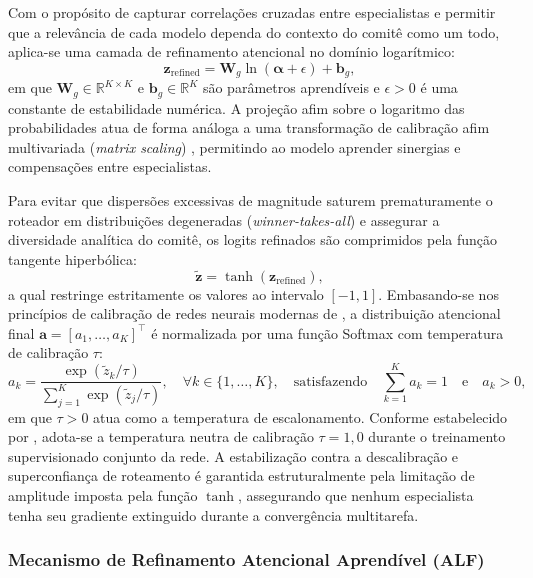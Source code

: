 Com o propósito de capturar correlações cruzadas entre especialistas e permitir que a relevância de cada modelo dependa do contexto do comitê como um todo, aplica-se uma camada de refinamento atencional no domínio logarítmico:
\begin{equation}
\label{eq:attention_refinement}
\mathbf{z}_{\mathrm{refined}} = \mathbf{W}_g \ln(\boldsymbol{\alpha} + \epsilon) + \mathbf{b}_g,
\end{equation}
em que $\mathbf{W}_g \in \mathbb{R}^{K \times K}$ e $\mathbf{b}_g \in \mathbb{R}^K$ são parâmetros aprendíveis e $\epsilon > 0$ é uma constante de estabilidade numérica. A projeção afim sobre o logaritmo das probabilidades atua de forma análoga a uma transformação de calibração afim multivariada (\emph{matrix scaling}) \cite{guo2017calibration}, permitindo ao modelo aprender sinergias e compensações entre especialistas.

Para evitar que dispersões excessivas de magnitude saturem prematuramente o roteador em distribuições degeneradas (\emph{winner-takes-all}) e assegurar a diversidade analítica do comitê, os logits refinados são comprimidos pela função tangente hiperbólica:
\begin{equation}
\label{eq:gating_tanh_theory}
\tilde{\mathbf{z}} = \tanh(\mathbf{z}_{\mathrm{refined}}),
\end{equation}
a qual restringe estritamente os valores ao intervalo $[-1, 1]$. Embasando-se nos princípios de calibração de redes neurais modernas de , a distribuição atencional final $\mathbf{a} = [a_1, \dots, a_K]^\top$ é normalizada por uma função Softmax com temperatura de calibração $\tau$:
\begin{equation}
\label{eq:gating_weights_theory}
a_k = \frac{\exp(\tilde{z}_k / \tau)}{\sum_{j=1}^K \exp(\tilde{z}_j / \tau)}, \quad \forall k \in \{1, \dots, K\}, \quad \text{satisfazendo} \quad \sum_{k=1}^K a_k = 1 \quad \text{e} \quad a_k > 0,
\end{equation}
em que $\tau > 0$ atua como a temperatura de escalonamento. Conforme estabelecido por , adota-se a temperatura neutra de calibração $\tau = 1{,}0$ durante o treinamento supervisionado conjunto da rede. A estabilização contra a descalibração e superconfiança de roteamento é garantida estruturalmente pela limitação de amplitude imposta pela função $\tanh$, assegurando que nenhum especialista tenha seu gradiente extinguido durante a convergência multitarefa.

\subsubsection{Mecanismo de Refinamento Atencional Aprendível (ALF)}

